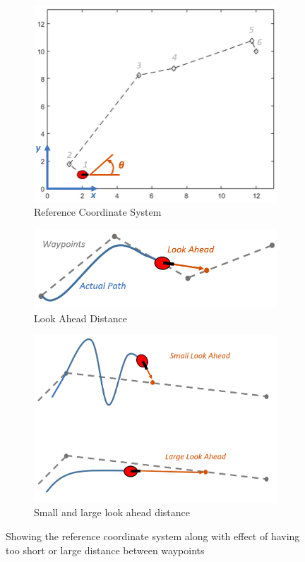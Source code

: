 \documentclass{article}
\begin{document}
		\begin{figure}[!h]
		\centering
		\begin{subfigure}[b]{0.3\textwidth}
			\includegraphics[width=\textwidth]{fig/fig5.png}
			\caption{Reference Coordinate System}
			\label{fig:image1}
		\end{subfigure}
		\hfill
		\begin{subfigure}[b]{0.3\textwidth}
			\includegraphics[width=\textwidth]{fig/fig6.png}
			\caption{Look Ahead Distance}
			\label{fig:image2}
		\end{subfigure}
		\hfill
		\begin{subfigure}[b]{0.3\textwidth}
			\includegraphics[width=\textwidth]{fig/fig7.png}
			\caption{Small and large look ahead distance}
			\label{fig:image3}
		\end{subfigure}
		\caption{Showing the reference coordinate system along with effect of having too short or large distance between waypoints}
		\label{fig:three_images}
	\end{figure}
\end{document}
